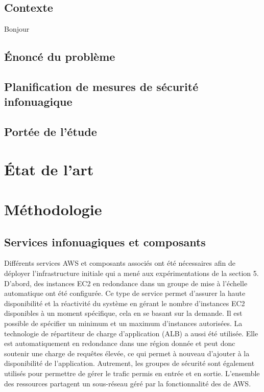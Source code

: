 \documentclass[conference]{IEEEtran}
\begin{document}
\subsection{Contexte}
Bonjour
\subsection{Énoncé du problème}

\subsection{Planification de mesures de sécurité infonuagique}

\subsection{Portée de l'étude}

\section{État de l'art}

\section{Méthodologie}

\subsection{Services infonuagiques et composants}
Différents services AWS et composants associés ont été nécessaires afin de déployer l’infrastructure initiale qui a mené aux expérimentations de la section 5. D’abord, des instances EC2 en redondance dans un groupe de mise à l’échelle automatique ont été configurée. Ce type de service permet d’assurer la haute disponibilité et la réactivité du système en gérant le nombre d’instances EC2 disponibles à un moment spécifique, cela en se basant sur la demande. Il est possible de spécifier un minimum et un maximum d’instances autorisées. La technologie de répartiteur de charge d’application (ALB) a aussi été utilisée. Elle est automatiquement en redondance dans une région donnée et peut donc soutenir une charge de requêtes élevée, ce qui permet à nouveau d’ajouter à la disponibilité de l’application. Autrement, les groupes de sécurité sont également utilisés pour permettre de gérer le trafic permis en entrée et en sortie. L’ensemble des ressources partagent un sous-réseau géré par la fonctionnalité des  de AWS.
\end{document}
